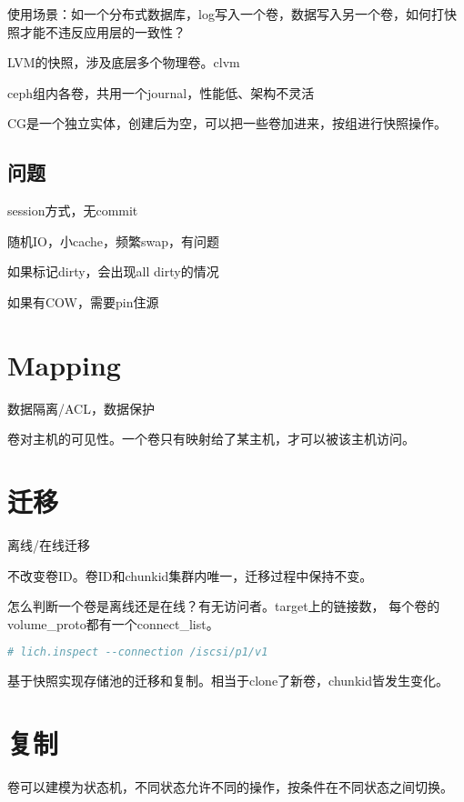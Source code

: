 使用场景：如一个分布式数据库，log写入一个卷，数据写入另一个卷，如何打快照才能不违反应用层的一致性？

LVM的快照，涉及底层多个物理卷。clvm

ceph组内各卷，共用一个journal，性能低、架构不灵活

CG是一个独立实体，创建后为空，可以把一些卷加进来，按组进行快照操作。

\subsection{问题}

\begin{enumbox}
\item session方式，无commit
\item 随机IO，小cache，频繁swap，有问题
\item 如果标记dirty，会出现all dirty的情况
\item 如果有COW，需要pin住源
\end{enumbox}

\section{Mapping}

数据隔离/ACL，数据保护

卷对主机的可见性。一个卷只有映射给了某主机，才可以被该主机访问。

\section{迁移}

离线/在线迁移

不改变卷ID。卷ID和chunkid集群内唯一，迁移过程中保持不变。

怎么判断一个卷是离线还是在线？有无访问者。target上的链接数，
每个卷的volume\_proto都有一个connect\_list。

\begin{lstlisting}[language=bash,frame=single]
# lich.inspect --connection /iscsi/p1/v1
\end{lstlisting}

基于快照实现存储池的迁移和复制。相当于clone了新卷，chunkid皆发生变化。

\section{复制}

卷可以建模为状态机，不同状态允许不同的操作，按条件在不同状态之间切换。

